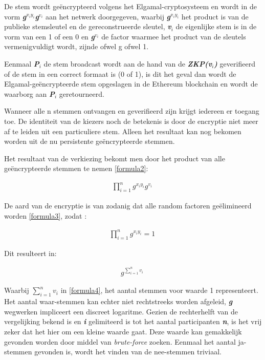 			De stem wordt geëncrypteerd volgens het Elgamal-cryptosysteem en wordt in de vorm  \textbf{\textit{g$^{x_{i}y_{i}}$g$^{v_{i}}$}} aan het netwerk doorgegeven,  waarbij  \textbf{\textit{g$^{x_{i}y_{i}}$}} het product is van de publieke stemsleutel en de gereconstrueerde sleutel, \textbf{\textit{v$_{i}$}} de eigenlijke stem is in de vorm van een 1 of een 0 en \textbf{\textit{g$^{v_{i}}$}} de factor waarmee het product van de sleutels vermenigvuldigt wordt, zijnde ofwel g ofwel 1. 
			
			Eenmaal \textbf{\textit{P$_{i}$}} de stem broadcast wordt aan de hand van de \textbf{\textit{ZKP(v$_{i}$)}} geverifieerd of de stem in een correct formaat is (0 of 1), is dit het geval dan wordt de Elgamal-geëncrypteerde stem opgeslagen in de Ethereum blockchain en wordt de waarborg aan \textbf{\textit{P$_{i}$}} geretourneerd.
			
			Wanneer alle n stemmen ontvangen en geverifieerd zijn krijgt iedereen er toegang toe. De identiteit van de kiezers noch de betekenis is door de encryptie niet meer af te leiden uit een particuliere stem. Alleen het resultaat kan nog bekomen worden uit de nu persistente geëncrypteerde stemmen.
			
			Het resultaat van de verkiezing bekomt men door het product van alle geëncrypteerde stemmen te nemen \eqref{formula2}: 	
			\begin{ceqn}
				\begin{align}
				\prod_{i=1}^{n}g^{x_{i}y_{i}}g^{v_{i}} \label{formula2}\
				\end{align}
			\end{ceqn}	
			De aard van de encryptie is van zodanig dat alle random factoren geëlimineerd worden \eqref{formula3}, zodat :	
			\begin{ceqn}
				\begin{align}
				\prod_{i=1}^{n}g^{x_{i}y_{i}} = 1 \label{formula3}\
				\end{align}
			\end{ceqn}
			Dit resulteert in:
			\begin{ceqn}
				\begin{align}
				g^{\sum_{i=1}^{n}v_{i}} \label{formula4}\
				\end{align}
			\end{ceqn}
			Waarbij \textbf{\textit{$\sum_{i=1}^{n}v_{i}$}} in \eqref{formula4}, het aantal stemmen voor waarde 1 representeert. Het aantal waar-stemmen kan echter niet rechtstreeks worden afgeleid, \textbf{\textit{g}}  wegwerken impliceert een discreet logaritme. Gezien de rechterhelft van de vergelijking bekend is en \textbf{\textit{i}} gelimiteerd is tot het aantal participanten \textbf{\textit{n}}, is het vrij zeker dat het hier om een kleine waarde gaat. Deze waarde kan gemakkelijk gevonden worden door middel van \textit{brute-force} zoeken. Eenmaal het aantal ja-stemmen gevonden is, wordt het vinden van de nee-stemmen triviaal.
			
